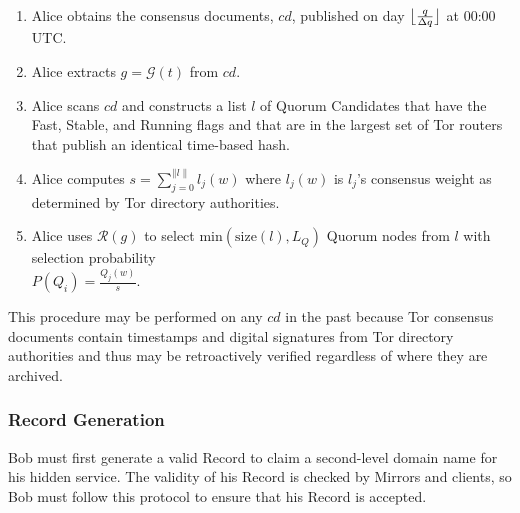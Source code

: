\documentclass[conference]{IEEEtran}
\DeclarePairedDelimiter{\floor}{\lfloor}{\rfloor}
\newcommand*\concat{\mathbin{\|}}
\begin{document}
\begin{enumerate}
	\item Alice obtains the consensus documents, $ \mathit{cd} $, published on day $ \floor[\big]{\frac{q}{\Delta q}} $ at 00:00 UTC.
	\item Alice extracts $ g = \mathcal{G}(t) $ from $ cd $.
	\item Alice scans $ \mathit{cd} $ and constructs a list $ l $ of Quorum Candidates that have the Fast, Stable, and Running flags and that are in the largest set of Tor routers that publish an identical time-based hash.
	\item Alice computes $ s = \sum_{j=0}^{\concat l \concat} l_{j}(w) $ where $ l_{j}(w) $ is $ l_{j} $'s consensus weight as determined by Tor directory authorities.
	\item Alice uses $ \mathcal{R}(g) $ to select $ \mathrm{min}(\mathrm{size}(l), L_{Q}) $ Quorum nodes from $ l $ with selection probability \\ $ P (Q_{i}) = \frac{Q_{j}(w)}{s} $.
\end{enumerate}

This procedure may be performed on any $ \mathit{cd} $ in the past because Tor consensus documents contain timestamps and digital signatures from Tor directory authorities and thus may be retroactively verified regardless of where they are archived.

\subsubsection{Record Generation}
\label{sec:RecordGeneration}

Bob must first generate a valid Record to claim a second-level domain name for his hidden service. The validity of his Record is checked by Mirrors and clients, so Bob must follow this protocol to ensure that his Record is accepted.
\end{document}

